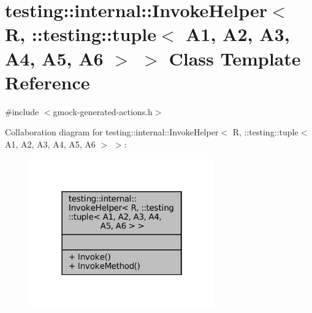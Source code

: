 \hypertarget{classtesting_1_1internal_1_1InvokeHelper_3_01R_00_01_1_1testing_1_1tuple_3_01A1_00_01A2_00_01A3_129338555c00c55487bfe9fa59e479ab}{}\section{testing\+:\+:internal\+:\+:Invoke\+Helper$<$ R, \+:\+:testing\+:\+:tuple$<$ A1, A2, A3, A4, A5, A6 $>$ $>$ Class Template Reference}
\label{classtesting_1_1internal_1_1InvokeHelper_3_01R_00_01_1_1testing_1_1tuple_3_01A1_00_01A2_00_01A3_129338555c00c55487bfe9fa59e479ab}


{\ttfamily \#include $<$gmock-\/generated-\/actions.\+h$>$}



Collaboration diagram for testing\+:\+:internal\+:\+:Invoke\+Helper$<$ R, \+:\+:testing\+:\+:tuple$<$ A1, A2, A3, A4, A5, A6 $>$ $>$\+:
\nopagebreak
\begin{figure}[H]
\begin{center}
\leavevmode
\includegraphics[width=226pt]{classtesting_1_1internal_1_1InvokeHelper_3_01R_00_01_1_1testing_1_1tuple_3_01A1_00_01A2_00_01A3_382b8156618de326b8a55b3502e2d228}
\end{center}
\end{figure}

